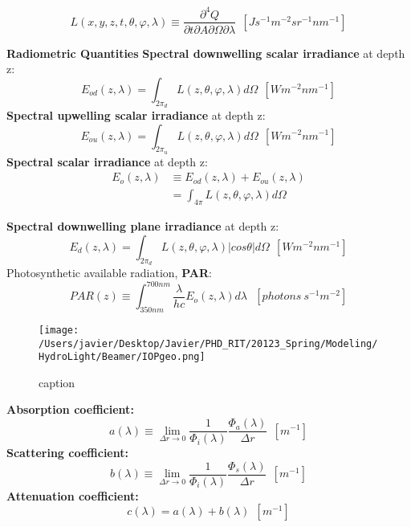 \begin{equation}
	L(x,y,z,t,\theta,\varphi,\lambda)\equiv\frac{\partial^4 Q}{\partial t\partial A\partial\Omega\partial\lambda}~~\left[ Js^{-1}m^{-2}sr^{-1}nm^{-1} \right]
\end{equation}


{\bf Radiometric Quantities}
\textbf{Spectral downwelling scalar irradiance} at depth z:
\begin{equation}
	E_{od}(z,\lambda)=\int_{2\pi_d} L(z,\theta,\varphi,\lambda)d\Omega~~\left[Wm^{-2}nm^{-1} \right]
\end{equation}
\textbf{Spectral upwelling scalar irradiance} at depth z:
\begin{equation}
	E_{ou}(z,\lambda)=\int_{2\pi_u} L(z,\theta,\varphi,\lambda)d\Omega~~\left[Wm^{-2}nm^{-1} \right]
\end{equation}
\textbf{Spectral scalar irradiance} at depth z:
\begin{align}
	E_{o}(z,\lambda) &\equiv E_{od}(z,\lambda)+E_{ou}(z,\lambda)\\
					 &=\int_{4\pi} L(z,\theta,\varphi,\lambda)d\Omega
\end{align}

\textbf{Spectral downwelling plane irradiance} at depth z:
\begin{equation}
	E_{d}(z,\lambda)=\int_{2\pi_d} L(z,\theta,\varphi,\lambda)|cos\theta|d\Omega~~\left[Wm^{-2}nm^{-1} \right]
\end{equation}
Photosynthetic available radiation, \textbf{PAR}:
\begin{equation}
	PAR(z)\equiv \int_{350nm}^{700nm} \frac{\lambda}{hc}E_o(z,\lambda)d\lambda~~~\left[photons~s^{-1}m^{-2} \right]
\end{equation}

		\begin{figure}[H]
		\centering
		\texttt{[image: /Users/javier/Desktop/Javier/PHD\_RIT/20123\_Spring/Modeling/HydroLight/Beamer/IOPgeo.png]}
		\caption{caption \label{label} } 
		\end{figure}

		\textbf{Absorption coefficient:}
		\begin{equation}
			a(\lambda)\equiv \lim_{\Delta r\to 0} \frac{1}{\Phi_i(\lambda)}\frac{\Phi_a(\lambda)}{\Delta r}~~\left[m^{-1} \right]
		\end{equation}
		\textbf{Scattering coefficient:}
		\begin{equation}
			b(\lambda)\equiv \lim_{\Delta r\to 0} \frac{1}{\Phi_i(\lambda)}\frac{\Phi_s(\lambda)}{\Delta r}~~\left[m^{-1} \right]
		\end{equation}
		\textbf{Attenuation coefficient:}
		\begin{equation}
			c(\lambda)=a(\lambda)+b(\lambda)~~\left[m^{-1} \right]
		\end{equation}

